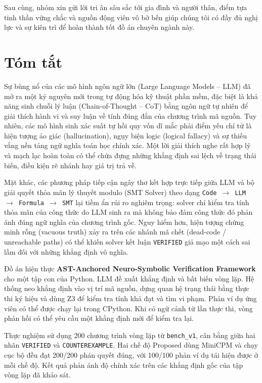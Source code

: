 Sau cùng, nhóm xin gửi lời tri ân sâu sắc tới gia đình và người thân, điểm tựa tinh thần vững chắc và nguồn động viên vô bờ bến giúp chúng tôi có đầy đủ nghị lực và sự kiên trì để hoàn thành tốt đồ án chuyên ngành này.



\chapter*{Tóm tắt}
Sự bùng nổ của các mô hình ngôn ngữ lớn (Large Language Models -- LLM) đã mở ra một kỷ nguyên mới trong tự động hóa kỹ thuật phần mềm, đặc biệt là khả năng sinh chuỗi lý luận (Chain-of-Thought -- CoT) bằng ngôn ngữ tự nhiên để giải thích hành vi và suy luận về tính đúng đắn của chương trình mã nguồn. Tuy nhiên, các mô hình sinh xác suất tự hồi quy vốn dĩ mắc phải điểm yếu chí tử là hiện tượng ảo giác (hallucination), ngụy biện logic (logical fallacy) và sự thiếu vắng nền tảng ngữ nghĩa toán học chính xác. Một lời giải thích nghe rất hợp lý và mạch lạc hoàn toàn có thể chứa đựng những khẳng định sai lệch về trạng thái biến, điều kiện rẽ nhánh hay giá trị trả về. 

Mặt khác, các phương pháp tiếp cận ngây thơ kết hợp trực tiếp giữa LLM và bộ giải quyết thỏa mãn lý thuyết modulo (SMT Solver) theo dạng \texttt{Code $\rightarrow$ LLM $\rightarrow$ Formula $\rightarrow$ SMT} lại tiềm ẩn rủi ro nghiêm trọng: solver chỉ kiểm tra tính thỏa mãn của công thức do LLM sinh ra mà không bảo đảm công thức đó phản ánh đúng ngữ nghĩa của chương trình gốc. Nguy hiểm hơn, hiện tượng chứng minh rỗng (vacuous truth) xảy ra trên các nhánh mã chết (dead-code / unreachable paths) có thể khiến solver kết luận \texttt{VERIFIED} giả mạo một cách sai lầm đối với những khẳng định vô nghĩa.

Đồ án hiện thực \textbf{AST-Anchored Neuro-Symbolic Verification Framework} cho một tập con của Python. LLM đề xuất khẳng định và bất biến vòng lặp. Hệ thống neo khẳng định vào vị trí mã nguồn, dựng quan hệ trạng thái bằng thực thi ký hiệu và dùng Z3 để kiểm tra tính khả đạt và tìm vi phạm. Phản ví dụ ứng viên có thể được chạy lại trong CPython. Khi có ngữ cảnh từ lần thực thi, vòng phản hồi có thể yêu cầu một khẳng định mới để kiểm tra lại.

Thực nghiệm sử dụng 200 chương trình vòng lặp từ \texttt{bench\_v1}, cân bằng giữa hai nhãn \texttt{VERIFIED} và \texttt{COUNTEREXAMPLE}. Hai chế độ Proposed dùng MiniCPM và chạy cục bộ đều đạt 200/200 phán quyết đúng, với 100/100 phản ví dụ tái hiện được ở mỗi chế độ. Kết quả phản ánh độ chính xác trên các khẳng định gốc của tập vòng lặp đã khảo sát.

